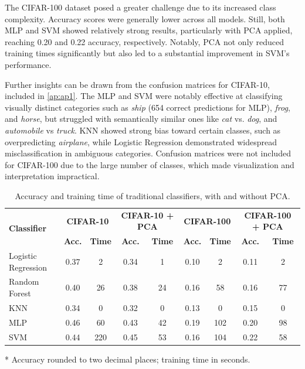 \documentclass[journal,article,submit,pdftex,moreauthors]{Definitions/mdpi}
\begin{document}
The CIFAR-100 dataset posed a greater challenge due to its increased class complexity. Accuracy scores were generally lower across all models. Still, both MLP and SVM showed relatively strong results, particularly with PCA applied, reaching 0.20 and 0.22 accuracy, respectively. Notably, PCA not only reduced training times significantly but also led to a substantial improvement in SVM’s performance.

Further insights can be drawn from the confusion matrices for CIFAR-10, included in \autoref{ap:ap1}. The MLP and SVM were notably effective at classifying visually distinct categories such as \textit{ship} (654 correct predictions for MLP), \textit{frog}, and \textit{horse}, but struggled with semantically similar ones like \textit{cat} vs. \textit{dog}, and \textit{automobile} vs \textit{truck}. KNN showed strong bias toward certain classes, such as overpredicting \textit{airplane}, while Logistic Regression demonstrated widespread misclassification in ambiguous categories. Confusion matrices were not included for CIFAR-100 due to the large number of classes, which made visualization and interpretation impractical.


\begin{table}[H]
\caption{Accuracy and training time of traditional classifiers, with and without PCA.\label{tab:classifiers_results}}
\centering
\begin{tabular}{lcccccccc}
\toprule
\multirow{2}{*}{\textbf{Classifier}} & \multicolumn{2}{c}{\textbf{CIFAR-10}} & \multicolumn{2}{c}{\textbf{CIFAR-10 + PCA}} & \multicolumn{2}{c}{\textbf{CIFAR-100}} & \multicolumn{2}{c}{\textbf{CIFAR-100 + PCA}} \\
\cmidrule(lr){2-3} \cmidrule(lr){4-5} \cmidrule(lr){6-7} \cmidrule(lr){8-9}
 & \textbf{Acc.} & \textbf{Time} & \textbf{Acc.} & \textbf{Time} & \textbf{Acc.} & \textbf{Time} & \textbf{Acc.} & \textbf{Time} \\
\midrule
Logistic Regression & 0.37 & 2 & 0.34 & 1 & 0.10 & 2 & 0.11 & 2 \\
Random Forest       & 0.40 & 26 & 0.38 & 24 & 0.16 & 58 & 0.16 & 77 \\
KNN                 & 0.34 & 0 & 0.32 & 0 & 0.13 & 0 & 0.15 & 0 \\
MLP                 & 0.46 & 60 & 0.43 & 42 & 0.19 & 102 & 0.20 & 98 \\
SVM                 & 0.44 & 220 & 0.45 & 53 & 0.16 & 104 & 0.22 & 58 \\
\bottomrule
\end{tabular}
\vspace{0.5em}

\noindent\footnotesize{* Accuracy rounded to two decimal places; training time in seconds.}
\end{table}
\end{document}
